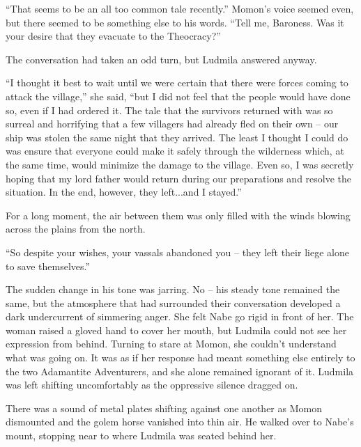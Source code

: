 “That seems to be an all too common tale recently.” Momon’s voice seemed even, but there seemed to be something else to his words. “Tell me, Baroness. Was it your desire that they evacuate to the Theocracy?”

 

The conversation had taken an odd turn, but Ludmila answered anyway.

 

“I thought it best to wait until we were certain that there were forces coming to attack the village,” she said, “but I did not feel that the people would have done so, even if I had ordered it. The tale that the survivors returned with was so surreal and horrifying that a few villagers had already fled on their own – our ship was stolen the same night that they arrived. The least I thought I could do was ensure that everyone could make it safely through the wilderness which, at the same time, would minimize the damage to the village. Even so, I was secretly hoping that my lord father would return during our preparations and resolve the situation. In the end, however, they left...and I stayed.”

 

For a long moment, the air between them was only filled with the winds blowing across the plains from the north.

 

“So despite your wishes, your vassals abandoned you – they left their liege alone to save themselves.”

 

The sudden change in his tone was jarring. No – his steady tone remained the same, but the atmosphere that had surrounded their conversation developed a dark undercurrent of simmering anger. She felt Nabe go rigid in front of her. The woman raised a gloved hand to cover her mouth, but Ludmila could not see her expression from behind. Turning to stare at Momon, she couldn’t understand what was going on. It was as if her response had meant something else entirely to the two Adamantite Adventurers, and she alone remained ignorant of it. Ludmila was left shifting uncomfortably as the oppressive silence dragged on.

 

There was a sound of metal plates shifting against one another as Momon dismounted and the golem horse vanished into thin air. He walked over to Nabe’s mount, stopping near to where Ludmila was seated behind her.

 

